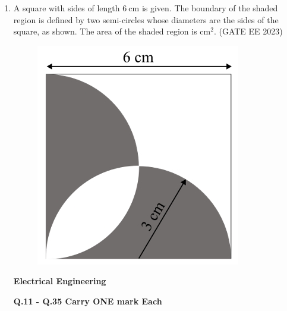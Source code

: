 \documentclass[a4paper,12pt]{exam}
\theoremstyle{remark}
\begin{document}
\begin{enumerate}
\item A square with sides of length $6 \ \text{cm}$ is given. The boundary of the shaded region is defined by two semi-circles whose diameters are the sides of the square, as shown. The area of the shaded region is \underline{\hspace{1cm}} $\text{cm}^2$. \hfill{(GATE EE 2023)}
\begin{figure}[h]
    \centering
    \includegraphics[width=0.5\columnwidth]{figs/Screenshot_17-8-2025_203345_.jpeg}
    \caption{}
    \label{fig:placeholder}
\end{figure}


\begin{enumerate}
\end{enumerate}

\raggedright{\textbf{Electrical Engineering}}\\
\vspace{0.5cm}
\raggedright{\textbf{Q.11 - Q.35 Carry ONE mark Each}}


\end{enumerate}
\end{document}
